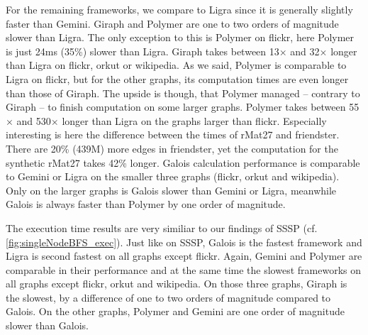 For the remaining frameworks, we compare to Ligra since it is generally slightly faster than Gemini.
Giraph and Polymer are one to two orders of magnitude slower than Ligra. The only exception to this is Polymer on flickr, here Polymer is just 24ms (35\%) slower than Ligra.
Giraph takes between 13$\times$ and 32$\times$ longer than Ligra on flickr, orkut or wikipedia.
As we said, Polymer is comparable to Ligra on flickr, but for the other graphs, its computation times are even longer than those of Giraph. The upside is though, that Polymer managed -- contrary to Giraph -- to finish computation on some larger graphs.
Polymer takes between 55$\times$ and 530$\times$ longer than Ligra on the graphs larger than flickr.
Especially interesting is here the difference between the times of rMat27 and friendster. There are 20\% (439M) more edges in friendster, yet the computation for the synthetic rMat27 takes 42\% longer.
Galois calculation performance is comparable to Gemini or Ligra on the smaller three graphs (flickr, orkut and wikipedia).
Only on the larger graphs is Galois slower than Gemini or Ligra, meanwhile Galois is always faster than Polymer by one order of magnitude.

The execution time results are very similiar to our findings of SSSP (cf. \autoref{fig:singleNodeBFS_exec}). Just like on SSSP, Galois is the fastest framework and Ligra is second fastest on all graphs except flickr.
Again, Gemini and Polymer are comparable in their performance and at the same time the slowest frameworks on all graphs except flickr, orkut and wikipedia.
On those three graphs, Giraph is the slowest, by a difference of one to two orders of magnitude compared to Galois.
On the other graphs, Polymer and Gemini are one order of magnitude slower than Galois.

